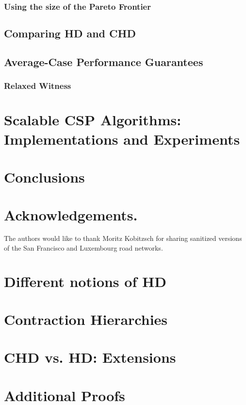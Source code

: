 \documentclass[a4paper,UKenglish]{lipics-v2016}
\theoremstyle{plain}
\begin{document}
\subsubsection{Using the size of the Pareto Frontier}
\label{sec:frontier}


\subsection{Comparing HD and CHD}
\label{ssec:hdvschd}


\subsection{Average-Case Performance Guarantees}
\label{sec:avg_hd}

\subsubsection{Relaxed Witness}
\label{sec:relaxed_witness}


\section{Scalable CSP Algorithms:\texorpdfstring{\\}{ } Implementations and Experiments}
\label{sec:numeric}


\section{Conclusions}
\label{sec:conclu}


\section*{Acknowledgements.}
The authors would like to thank Moritz Kobitzsch for sharing sanitized versions of the San Francisco and Luxembourg road networks.


\appendix
\section{Different notions of HD}
\label{app:generalhd}


\section{Contraction Hierarchies}


\section{CHD vs. HD: Extensions}
\label{app:extn}



\section{Additional Proofs}
\label{sec:proofs}





\end{document}

